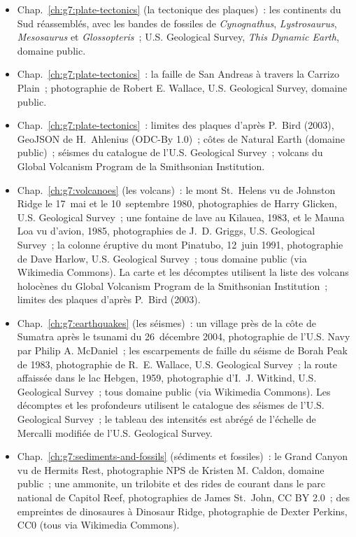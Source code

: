 \begin{itemize}
  \item Chap.~\ref{ch:g7:plate-tectonics} (la tectonique des plaques)~: les continents du Sud réassemblés, avec les bandes de fossiles de \emph{Cynognathus}, \emph{Lystrosaurus}, \emph{Mesosaurus} et \emph{Glossopteris}~; U.S. Geological Survey, \emph{This Dynamic Earth}, domaine public.
  \item Chap.~\ref{ch:g7:plate-tectonics}~: la faille de San Andreas à travers la Carrizo Plain~; photographie de Robert E. Wallace, U.S. Geological Survey, domaine public.
  \item Chap.~\ref{ch:g7:plate-tectonics}~: limites des plaques d'après P.~Bird (2003), GeoJSON de H.~Ahlenius (ODC-By 1.0)~; côtes de Natural Earth (domaine public)~; séismes du catalogue de l'U.S. Geological Survey~; volcans du Global Volcanism Program de la Smithsonian Institution.
  \item Chap.~\ref{ch:g7:volcanoes} (les volcans)~: le mont St.~Helens vu de Johnston Ridge le 17~mai et le 10~septembre 1980, photographies de Harry Glicken, U.S. Geological Survey~; une fontaine de lave au Kilauea, 1983, et le Mauna Loa vu d'avion, 1985, photographies de J.~D. Griggs, U.S. Geological Survey~; la colonne éruptive du mont Pinatubo, 12~juin 1991, photographie de Dave Harlow, U.S. Geological Survey~; tous domaine public (via Wikimedia Commons). La carte et les décomptes utilisent la liste des volcans holocènes du Global Volcanism Program de la Smithsonian Institution~; limites des plaques d'après P.~Bird (2003).
  \item Chap.~\ref{ch:g7:earthquakes} (les séismes)~: un village près de la côte de Sumatra après le tsunami du 26~décembre 2004, photographie de l'U.S. Navy par Philip A. McDaniel~; les escarpements de faille du séisme de Borah Peak de 1983, photographie de R.~E. Wallace, U.S. Geological Survey~; la route affaissée dans le lac Hebgen, 1959, photographie d'I.~J. Witkind, U.S. Geological Survey~; tous domaine public (via Wikimedia Commons). Les décomptes et les profondeurs utilisent le catalogue des séismes de l'U.S. Geological Survey~; le tableau des intensités est abrégé de l'échelle de Mercalli modifiée de l'U.S. Geological Survey.
  \item Chap.~\ref{ch:g7:sediments-and-fossils} (sédiments et fossiles)~: le Grand Canyon vu de Hermits Rest, photographie NPS de Kristen M. Caldon, domaine public~; une ammonite, un trilobite et des rides de courant dans le parc national de Capitol Reef, photographies de James St.~John, CC BY 2.0~; des empreintes de dinosaures à Dinosaur Ridge, photographie de Dexter Perkins, CC0 (tous via Wikimedia Commons).

\end{itemize}
